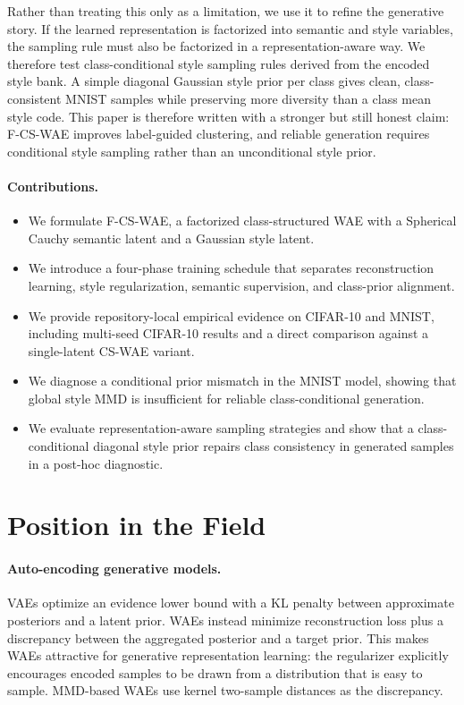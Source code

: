 \documentclass[10pt]{article}
\newcommand{\ours}{F-CS-WAE}
\newcommand{\simple}{CS-WAE}
\begin{document}
Rather than treating this only as a limitation, we use it to refine the generative story. If the learned representation is factorized into semantic and style variables, the sampling rule must also be factorized in a representation-aware way. We therefore test class-conditional style sampling rules derived from the encoded style bank. A simple diagonal Gaussian style prior per class gives clean, class-consistent MNIST samples while preserving more diversity than a class mean style code. This paper is therefore written with a stronger but still honest claim: \ours{} improves label-guided clustering, and reliable generation requires conditional style sampling rather than an unconditional style prior.

\paragraph{Contributions.}
\begin{itemize}
    \item We formulate \ours, a factorized class-structured WAE with a Spherical Cauchy semantic latent and a Gaussian style latent.
    \item We introduce a four-phase training schedule that separates reconstruction learning, style regularization, semantic supervision, and class-prior alignment.
    \item We provide repository-local empirical evidence on CIFAR-10 and MNIST, including multi-seed CIFAR-10 results and a direct comparison against a single-latent \simple{} variant.
    \item We diagnose a conditional prior mismatch in the MNIST model, showing that global style MMD is insufficient for reliable class-conditional generation.
    \item We evaluate representation-aware sampling strategies and show that a class-conditional diagonal style prior repairs class consistency in generated samples in a post-hoc diagnostic.
\end{itemize}

\section{Position in the Field}

\paragraph{Auto-encoding generative models.}
VAEs \citep{kingma2013autoencoding} optimize an evidence lower bound with a KL penalty between approximate posteriors and a latent prior. WAEs \citep{tolstikhin2017wasserstein} instead minimize reconstruction loss plus a discrepancy between the aggregated posterior and a target prior. This makes WAEs attractive for generative representation learning: the regularizer explicitly encourages encoded samples to be drawn from a distribution that is easy to sample. MMD-based WAEs use kernel two-sample distances \citep{gretton2012kernel} as the discrepancy.
\end{document}
